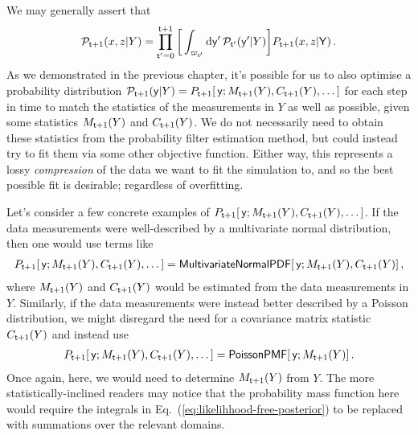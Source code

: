 We may generally assert that 
\begin{align}
{\cal P}_{{\sf t}+1}(x,z\vert Y)=\prod_{{\sf t}'=0}^{{\sf t}+1} \bigg[ \int_{\varpi_{{\sf t}'}} {\rm d}{\sf y}' \, {\cal P}_{{\sf t}'}({\sf y}'\vert Y) \bigg] P_{{\sf t}+1}(x,z \vert {\sf Y}) \label{eq:likelihhood-free-posterior} \,.
\end{align}
As we demonstrated in the previous chapter, it's possible for us to also optimise a probability distribution ${\cal P}_{{\sf t}+1}({\sf y}\vert Y) = P_{{\sf t}+1}[\,{\sf y};M_{{\sf t}+1}(Y),C_{{\sf t}+1}(Y), \dots ]$ for each step in time to match the statistics of the measurements in $Y$ as well as possible, given some statistics $M_{{\sf t}+1}(Y)$ and $C_{{\sf t}+1}(Y)$. We do not necessarily need to obtain these statistics from the probability filter estimation method, but could instead try to fit them via some other objective function. Either way, this represents a lossy \emph{compression} of the data we want to fit the simulation to, and so the best possible fit is desirable; regardless of overfitting.

Let's consider a few concrete examples of $P_{{\sf t}+1}[\,{\sf y};M_{{\sf t}+1}(Y),C_{{\sf t}+1}(Y), \dots ]$. If the data measurements were well-described by a multivariate normal distribution, then one would use terms like
\begin{align}
P_{{\sf t}+1}[\,{\sf y};M_{{\sf t}+1}(Y),C_{{\sf t}+1}(Y), \dots ] = {\sf MultivariateNormalPDF}[\,{\sf y};M_{{\sf t}+1}(Y),C_{{\sf t}+1}(Y)]\,,
\end{align}
where $M_{{\sf t}+1}(Y)$ and $C_{{\sf t}+1}(Y)$ would be estimated from the data measurements in $Y$. Similarly, if the data measurements were instead better described by a Poisson distribution, we might disregard the need for a covariance matrix statistic $C_{{\sf t}+1}(Y)$ and instead use
\begin{align}
P_{{\sf t}+1}[\,{\sf y};M_{{\sf t}+1}(Y),C_{{\sf t}+1}(Y), \dots ] = {\sf PoissonPMF}[\,{\sf y};M_{{\sf t}+1}(Y)]\,.
\end{align}
Once again, here, we would need to determine $M_{{\sf t}+1}(Y)$ from $Y$. The more statistically-inclined readers may notice that the probability mass function here would require the integrals in Eq.~(\ref{eq:likelihhood-free-posterior}) to be replaced with summations over the relevant domains.

